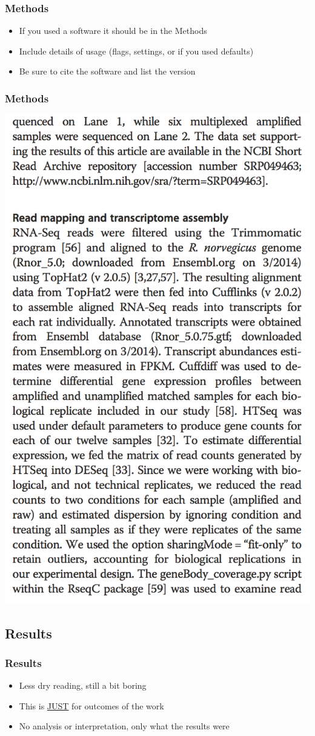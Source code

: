 \documentclass[14pt,handout]{beamer}
\begin{document}
\begin{frame}
\frametitle{Methods}
\begin{itemize}
	\sffamily
	\normalsize
	\item<+-> If you used a software it should be in the Methods
	\item<+-> Include details of usage (flags, settings, or if you used defaults)
	\item<+-> Be sure to cite the software and list the version
\end{itemize}
\end{frame}

\begin{frame}
\frametitle{Methods}
\begin{center}
	\includegraphics[width=.5\textwidth]{images_20171109_methods.png}
\end{center}
\end{frame}

\subsection{Results}

\begin{frame}
\frametitle{Results}
\begin{itemize}
	\sffamily
	\normalsize
	\item<+-> Less dry reading, still a bit boring
	\item<+-> This is \underline{JUST} for outcomes of the work
	\item<+-> No analysis or interpretation, only what the results were
\end{itemize}
\end{frame}
\end{document}
